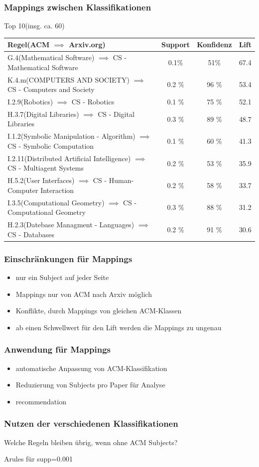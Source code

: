 \documentclass[12pt, xcolor=table]{beamer}
\begin{document}
\begin{frame}
	\frametitle{Mappings zwischen Klassifikationen}
	Top 10(insg. ca. 60)
	\begin{tabular}{lccc}
		\tiny\textbf{Regel(ACM $\implies$ Arxiv.org)} &\tiny \textbf{Support} &\tiny \textbf{Konfidenz} & \tiny \textbf{Lift}\\
		\hline
		\tiny G.4(Mathematical Software) $\implies$ CS - Mathematical Software & \tiny 0.1\% &\tiny 51\% &\tiny 67.4  \\
		\tiny K.4.m(COMPUTERS AND SOCIETY) $\implies$ CS - Computers and Society &\tiny 0.2 \% &\tiny 96 \%  &\tiny 53.4 \\
		\tiny I.2.9(Robotics) $\implies$ CS - Robotics &\tiny 0.1 \% &\tiny 75 \%  &\tiny 52.1 \\
		\tiny H.3.7(Digital Libraries) $\implies$ CS - Digital Libraries &\tiny 0.3 \% &\tiny 89 \% &\tiny 48.7 \\
		\tiny I.1.2(Symbolic Manipulation - Algorithm) $\implies$ CS - Symbolic Computation  &\tiny 0.1 \% &\tiny 60 \%  &\tiny 41.3 \\
		\tiny I.2.11(Distributed Artificial Intelligence) $\implies$ CS - Multiagent Systems  &\tiny 0.2 \% &\tiny 53 \%  &\tiny 35.9 \\
		\tiny H.5.2(User Interfaces) $\implies$ CS - Human-Computer Interaction &\tiny 0.2 \% &\tiny 58 \%  &\tiny 33.7 \\
		\tiny I.3.5(Computational Geometry) $\implies$ CS - Computational Geometry &\tiny 0.3 \% &\tiny 88 \%  &\tiny 31.2 \\
		\tiny H.2.3(Datebase Managment - Languages) $\implies$ CS - Databases &\tiny 0.2 \% &\tiny 91 \%  &\tiny 30.6 \\
	\end{tabular}
\end{frame}
\begin{frame}
	\frametitle{Einschränkungen für Mappings}
    \begin{itemize}
	\item nur ein Subject auf jeder Seite
	\item Mappings nur von ACM nach Arxiv möglich
	\item Konflikte, durch Mappings von gleichen ACM-Klassen
	\item ab einen Schwellwert für den Lift werden die Mappings zu ungenau
    \end{itemize}
\end{frame}
\begin{frame}
	\frametitle{Anwendung für Mappings}
    \begin{itemize}
	\item automatische Anpassung von ACM-Klassifikation
	\item Reduzierung von Subjects pro Paper für Analyse
	\item recommendation
    \end{itemize}
\end{frame}
\begin{frame}[fragile]
    \frametitle{Nutzen der verschiedenen Klassifikationen}
     Welche Regeln bleiben übrig, wenn ohne ACM Subjects?\\
    \begin{block}{Arules für supp=0.001}
    	
	\end{block}
\end{frame}
\end{document}
